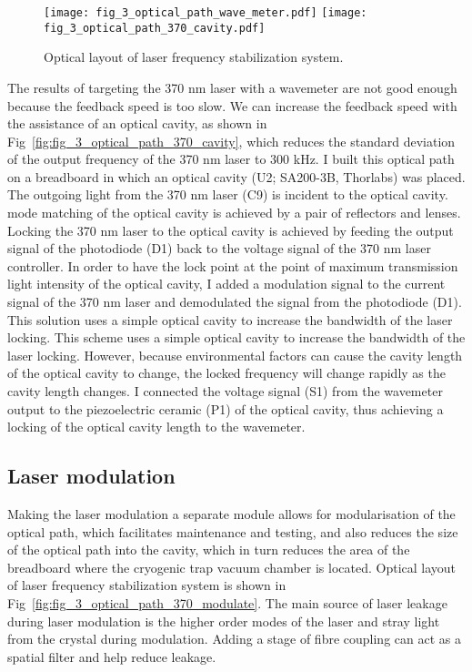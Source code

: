 \begin{figure}
    \centering
    {\texttt{[image: fig\_3\_optical\_path\_wave\_meter.pdf]}}
    {\texttt{[image: fig\_3\_optical\_path\_370\_cavity.pdf]}}
    \caption{Optical layout of laser frequency stabilization system.}
\end{figure}

The results of targeting the 370 nm laser with a wavemeter are not good enough because the feedback speed is too slow. We can increase the feedback speed with the assistance of an optical cavity, as shown in Fig~\ref{fig:fig_3_optical_path_370_cavity}, which reduces the standard deviation of the output frequency of the 370 nm laser to 300 kHz. I built this optical path on a breadboard in which an optical cavity (U2; SA200-3B, Thorlabs) was placed. The outgoing light from the 370 nm laser (C9) is incident to the optical cavity. mode matching of the optical cavity is achieved by a pair of reflectors and lenses. Locking the 370 nm laser to the optical cavity is achieved by feeding the output signal of the photodiode (D1) back to the voltage signal of the 370 nm laser controller. In order to have the lock point at the point of maximum transmission light intensity of the optical cavity, I added a modulation signal to the current signal of the 370 nm laser and demodulated the signal from the photodiode (D1). This solution uses a simple optical cavity to increase the bandwidth of the laser locking. This scheme uses a simple optical cavity to increase the bandwidth of the laser locking. However, because environmental factors can cause the cavity length of the optical cavity to change, the locked frequency will change rapidly as the cavity length changes. I connected the voltage signal (S1) from the wavemeter output to the piezoelectric ceramic (P1) of the optical cavity, thus achieving a locking of the optical cavity length to the wavemeter.

\subsection{Laser modulation}

Making the laser modulation a separate module allows for modularisation of the optical path, which facilitates maintenance and testing, and also reduces the size of the optical path into the cavity, which in turn reduces the area of the breadboard where the cryogenic trap vacuum chamber is located. Optical layout of laser frequency stabilization system is shown in Fig~\ref{fig:fig_3_optical_path_370_modulate}. The main source of laser leakage during laser modulation is the higher order modes of the laser and stray light from the crystal during modulation. Adding a stage of fibre coupling can act as a spatial filter and help reduce leakage.

